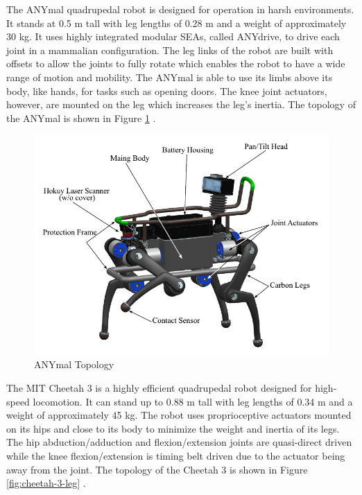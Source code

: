 \documentclass[english]{upeeei}
\begin{document}
The ANYmal quadrupedal robot is designed for operation in harsh environments. It stands at 0.5 m tall with leg lengths of 0.28 m and a weight of approximately 30 kg. It uses highly integrated modular SEAs, called ANYdrive, to drive each joint in a mammalian configuration. The leg links of the robot are built with offsets to allow the joints to fully rotate which enables the robot to have a wide range of motion and mobility. The ANYmal is able to use its limbs above its body, like hands, for tasks such as opening doors. The knee joint actuators, however, are mounted on the leg which increases the leg's inertia. The topology of the ANYmal is shown in Figure \ref{fig:anymal} \cite{anymal, anymal2}.

\begin{figure}[H]
\begin{centering}
\includegraphics[width=0.7\columnwidth]{images/anymal}
\par\end{centering}
\caption{ANYmal Topology\label{fig:anymal}}
\end{figure}

The MIT Cheetah 3 is a highly efficient quadrupedal robot designed for high-speed locomotion. It can stand up to 0.88 m tall with leg lengths of 0.34 m and a weight of approximately 45 kg. The robot uses proprioceptive actuators mounted on its hips and close to its body to minimize the weight and inertia of its legs. The hip abduction/adduction and flexion/extension joints are quasi-direct driven while the knee flexion/extension is timing belt driven due to the actuator being away from the joint. The topology of the Cheetah 3 is shown in Figure \ref{fig:cheetah-3-leg} \cite{mitcheetah3}.
\end{document}
